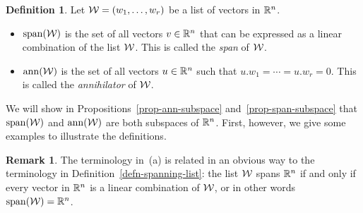 \documentclass[reqno]{amsart}
\theoremstyle{definition}
\newtheorem{remark}[theorem]{Remark}
\newtheorem{definition}[theorem]{Definition}
\begin{document}
\begin{definition}\label{defn-span-ann}
 Let $\mathcal{W}=(w_1,\dotsc,w_r)$ be a list of vectors in ${\mathbb{R}}^n$.
 \begin{itemize}
  \item[(a)] $\operatorname{span}(\mathcal{W})$ is the set of all vectors $v\in{\mathbb{R}}^n$ that can
   be expressed as a linear combination of the list $\mathcal{W}$.
   This is called the \emph{span} of $\mathcal{W}$.
  \item[(b)] $\operatorname{ann}(\mathcal{W})$ is the set of all vectors $u\in{\mathbb{R}}^n$ such
   that $u.w_1=\dotsb=u.w_r=0$.
   This is called the \emph{annihilator} of $\mathcal{W}$.
 \end{itemize}
\end{definition}

We will show in Propositions~\ref{prop-ann-subspace}
and~\ref{prop-span-subspace} that $\operatorname{span}(\mathcal{W})$ and $\operatorname{ann}(\mathcal{W})$ are both
subspaces of ${\mathbb{R}}^n$.  First, however, we give some examples to
illustrate the definitions.

\begin{remark}\label{rem-span-span}
 The terminology in~(a) is related in an obvious way to the
 terminology in Definition~\ref{defn-spanning-list}: the list $\mathcal{W}$
 spans ${\mathbb{R}}^n$ if and only if every vector in ${\mathbb{R}}^n$ is a linear
 combination of $\mathcal{W}$, or in other words $\operatorname{span}(\mathcal{W})={\mathbb{R}}^n$.
\end{remark}
\end{document}
